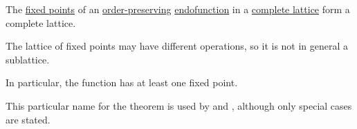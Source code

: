 \begin{theorem}\label{thm:knaster_tarski_theorem}
  The \hyperref[def:fixed_point]{fixed points} of an \hyperref[def:order_function]{order-preserving} \hyperref[def:function/endofunction]{endofunction} in a \hyperref[def:complete_lattice]{complete lattice} form a complete lattice.
\end{theorem}
\begin{comments}
  \item The lattice of fixed points may have different operations, so it is not in general a sublattice.
  \item In particular, the function has at least one fixed point.
  \item This particular name for the theorem is used by  and , although only special cases are stated.
\end{comments}
